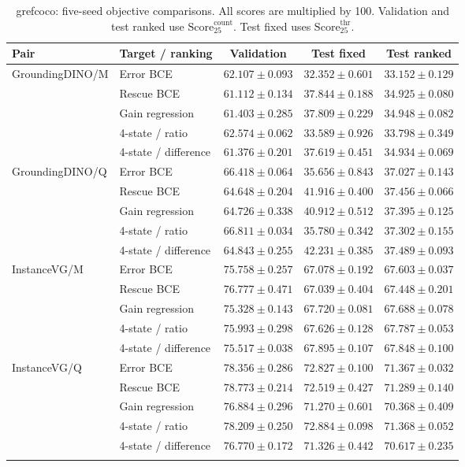\begin{table}[H]\centering
\caption{grefcoco: five-seed objective comparisons. All scores are multiplied by 100. Validation and test ranked use $\mathrm{Score}_{25}^{\mathrm{count}}$. Test fixed uses $\mathrm{Score}_{25}^{\mathrm{thr}}$.}
\fontsize{7.5}{9}\selectfont
\setlength{\tabcolsep}{3pt}
\begin{tabular}{llccc}\toprule
Pair & Target / ranking & Validation & Test fixed & Test ranked \\\midrule
GroundingDINO/M & Error BCE & $62.107\pm0.093$ & $32.352\pm0.601$ & $33.152\pm0.129$ \\
 & Rescue BCE & $61.112\pm0.134$ & $37.844\pm0.188$ & $34.925\pm0.080$ \\
 & Gain regression & $61.403\pm0.285$ & $37.809\pm0.229$ & $34.948\pm0.082$ \\
 & 4-state / ratio & $62.574\pm0.062$ & $33.589\pm0.926$ & $33.798\pm0.349$ \\
 & 4-state / difference & $61.376\pm0.201$ & $37.619\pm0.451$ & $34.934\pm0.069$ \\
\addlinespace
GroundingDINO/Q & Error BCE & $66.418\pm0.064$ & $35.656\pm0.843$ & $37.027\pm0.143$ \\
 & Rescue BCE & $64.648\pm0.204$ & $41.916\pm0.400$ & $37.456\pm0.066$ \\
 & Gain regression & $64.726\pm0.338$ & $40.912\pm0.512$ & $37.395\pm0.125$ \\
 & 4-state / ratio & $66.811\pm0.034$ & $35.780\pm0.342$ & $37.302\pm0.155$ \\
 & 4-state / difference & $64.843\pm0.255$ & $42.231\pm0.385$ & $37.489\pm0.093$ \\
\addlinespace
InstanceVG/M & Error BCE & $75.758\pm0.257$ & $67.078\pm0.192$ & $67.603\pm0.037$ \\
 & Rescue BCE & $76.777\pm0.471$ & $67.039\pm0.404$ & $67.448\pm0.201$ \\
 & Gain regression & $75.328\pm0.143$ & $67.720\pm0.081$ & $67.688\pm0.078$ \\
 & 4-state / ratio & $75.993\pm0.298$ & $67.626\pm0.128$ & $67.787\pm0.053$ \\
 & 4-state / difference & $75.517\pm0.038$ & $67.895\pm0.107$ & $67.848\pm0.100$ \\
\addlinespace
InstanceVG/Q & Error BCE & $78.356\pm0.286$ & $72.827\pm0.100$ & $71.367\pm0.032$ \\
 & Rescue BCE & $78.773\pm0.214$ & $72.519\pm0.427$ & $71.289\pm0.140$ \\
 & Gain regression & $76.884\pm0.296$ & $71.270\pm0.601$ & $70.368\pm0.409$ \\
 & 4-state / ratio & $78.209\pm0.250$ & $72.884\pm0.098$ & $71.368\pm0.052$ \\
 & 4-state / difference & $76.770\pm0.172$ & $71.326\pm0.442$ & $70.617\pm0.235$ \\
\addlinespace
\bottomrule\end{tabular}\end{table}
